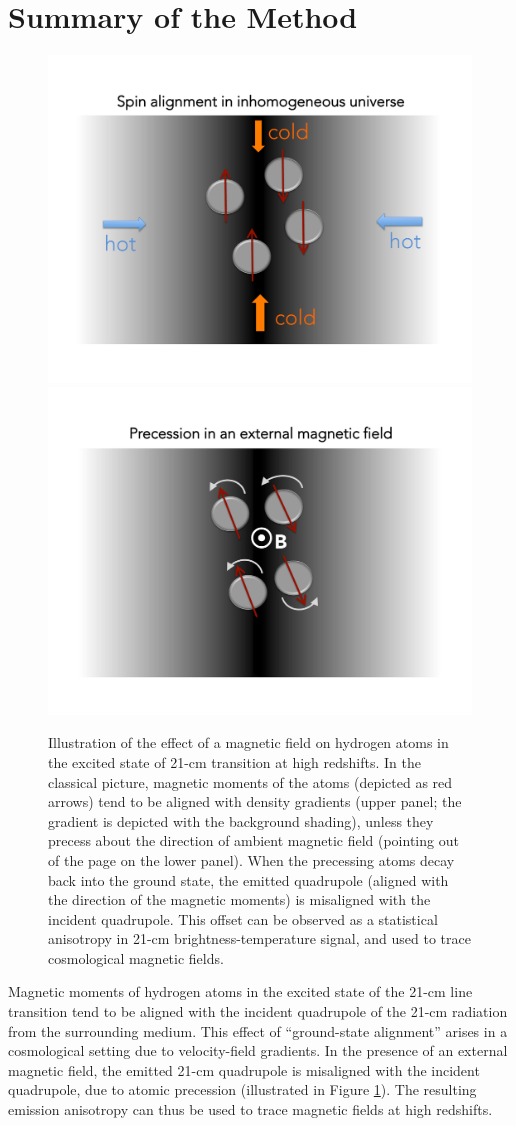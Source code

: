 \section{Summary of the Method}
\label{sec:method}

\begin{figure}
\centering
\includegraphics[width=.35\textwidth,keepaspectratio=true]{Slide2.pdf}
\includegraphics[width=.35\textwidth,keepaspectratio=true]{Slide3.pdf}
\caption{Illustration of the effect of a magnetic field on hydrogen atoms in the excited state of 21-cm transition at high redshifts. In the classical picture, magnetic moments of the atoms (depicted as red arrows) tend to be aligned with density gradients (upper panel; the gradient is depicted with the background shading), unless they precess about the direction of ambient magnetic field (pointing out of the page on the lower panel). When the precessing atoms decay back into the ground state, the emitted quadrupole (aligned with the direction of the magnetic moments) is misaligned with the incident quadrupole. This offset can be observed as a statistical anisotropy in 21-cm brightness-temperature signal, and used to trace cosmological magnetic fields.\label{fig:precession}}
\end{figure}
Magnetic moments of hydrogen atoms in the excited state of the 21-cm line transition tend to be aligned with the incident quadrupole of the 21-cm radiation from the surrounding medium. This effect of ``ground-state alignment'' \cite{Yan08,Yan12} arises in a cosmological setting due to velocity-field gradients. In the presence of an external magnetic field, the emitted 21-cm quadrupole is misaligned with the incident quadrupole, due to atomic precession (illustrated in Figure \ref{fig:precession}). The resulting emission anisotropy can thus be used to trace magnetic fields at high redshifts.

